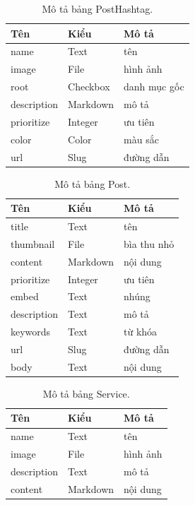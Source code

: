 \documentclass[11pt]{report}
\begin{document}
	
	\begin{table}[h!]
		\begin{center}
			\caption{Mô tả bảng PostHashtag.}
			\begin{tabularx}{0.6\textwidth}{ |l|l|X| } 
				\hline
				Tên & Kiểu & Mô tả \\
				\hline
				name & Text & tên \\
				image & File & hình ảnh \\
				root & Checkbox & danh mục gốc \\
				description & Markdown & mô tả \\
				prioritize & Integer & ưu tiên \\
				color & Color & màu sắc \\
				url & Slug & đường dẫn \\ 
				\hline
			\end{tabularx}
			\label{table:PostHashtag}
		\end{center}
	\end{table}
	
	\clearpage
	\begin{table}[h!]
		\begin{center}
			\caption{Mô tả bảng Post.}
			\begin{tabularx}{0.6\textwidth}{ |l|l|X| } 
				\hline
				Tên & Kiểu & Mô tả \\
				\hline
				title & Text & tên \\
				thumbnail & File & bìa thu nhỏ \\
				content & Markdown & nội dung \\
				prioritize & Integer & ưu tiên \\
				embed & Text & nhúng \\
				description & Text & mô tả \\
				keywords & Text & từ khóa \\
				url & Slug & đường dẫn \\
				body & Text & nội dung \\ 
				\hline
			\end{tabularx}
			\label{table:Post}
		\end{center}
	\end{table}
	
	
	\begin{table}[h!]
		\begin{center}
			\caption{Mô tả bảng Service.}
			\begin{tabularx}{0.6\textwidth}{ |l|l|X| } 
				\hline
				Tên & Kiểu & Mô tả \\
				\hline
				name & Text & tên \\
				image & File & hình ảnh \\
				description & Text & mô tả \\
				content & Markdown & nội dung \\ 
				\hline
			\end{tabularx}
			\label{table:Service}
		\end{center}
	\end{table}
	
\end{document}
